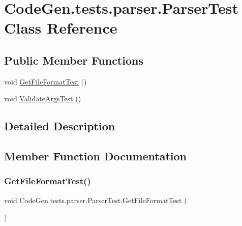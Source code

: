 \hypertarget{classCodeGen_1_1tests_1_1parser_1_1ParserTest}{}\section{Code\+Gen.\+tests.\+parser.\+Parser\+Test Class Reference}
\label{classCodeGen_1_1tests_1_1parser_1_1ParserTest}


 


\subsection*{Public Member Functions}
\begin{DoxyCompactItemize}
\item 
void \mbox{\hyperlink{classCodeGen_1_1tests_1_1parser_1_1ParserTest_a2ff958c473c175a86ea7823169a89f45}{Get\+File\+Format\+Test}} ()
\item 
void \mbox{\hyperlink{classCodeGen_1_1tests_1_1parser_1_1ParserTest_ad2dd3e55f52ce80b354d70751bd6915a}{Validate\+Args\+Test}} ()
\end{DoxyCompactItemize}


\subsection{Detailed Description}




\subsection{Member Function Documentation}
\mbox{\label{classCodeGen_1_1tests_1_1parser_1_1ParserTest_a2ff958c473c175a86ea7823169a89f45}} 
\subsubsection{\texorpdfstring{Get\+File\+Format\+Test()}{GetFileFormatTest()}}
{\footnotesize\ttfamily void Code\+Gen.\+tests.\+parser.\+Parser\+Test.\+Get\+File\+Format\+Test (\begin{DoxyParamCaption}{ }\end{DoxyParamCaption})\hspace{0.3cm}{\ttfamily [inline]}}





